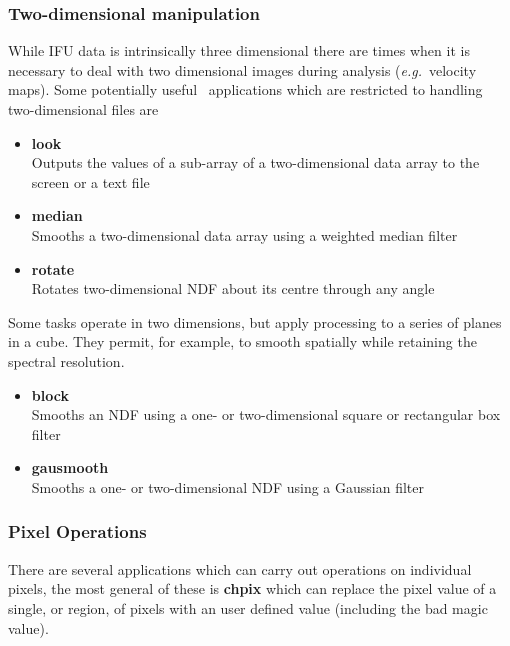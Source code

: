 \documentclass[twoside,11pt]{article}
\newcommand{\xref}[3]{#1}
\begin{document}
{\subsubsection{Two-dimensional manipulation}

While IFU data is intrinsically three dimensional there are times when
it is necessary to deal with two dimensional images during analysis
(\emph{e.g.}\ velocity maps).  Some potentially useful \KAPPA\
applications which are restricted to handling two-dimensional files
are

\begin{itemize}
\item{\xref{{\bf look}}{sun95}{LOOK}}\\
Outputs the values of a sub-array of a two-dimensional data array to the screen or a text file
\item{\xref{{\bf median}}{sun95}{MEDIAN}}\\ 
Smooths a two-dimensional data array using a weighted median filter 
\item{\xref{{\bf rotate}}{sun95}{ROTATE}}\\
Rotates two-dimensional NDF about its centre through any angle 
\end{itemize}

Some tasks operate in two dimensions, but apply processing to a series
of planes in a cube.  They permit, for example, to smooth spatially
while retaining the spectral resolution.

\begin{itemize}
\item{\xref{{\bf block}}{sun95}{BLOCK}}\\
Smooths an NDF using a one- or two-dimensional square or rectangular box filter
\item{\xref{{\bf gausmooth}}{sun95}{GAUSMOOTH}}\\
Smooths a one- or two-dimensional NDF using a Gaussian filter
\end{itemize}


\subsubsection{Pixel Operations}

There are several applications which can carry out operations on
individual pixels, the most general of these is \xref{{\bf
chpix}}{sun95}{CHPIX} which can replace the pixel value of a single,
or region, of pixels with an user defined value (including the bad
\xref{magic value}{sun95}{se_masking}).

}
\end{document}
